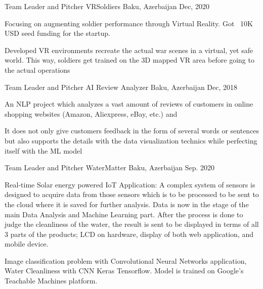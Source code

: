 

\begin{cventries}

  \cventry
    {Team Leader and Pitcher} %
    {VRSoldiers} %
    {Baku, Azerbaijan} %
    {Dec, 2020} %
    {
      \begin{cvitems} %
        \item {Focusing on augmenting soldier performance through Virtual Reality. Got ~10K USD seed funding for the startup.}
        \item {Developed VR environments recreate the actual war scenes in a virtual, yet safe world. This way, soldiers get trained on the 3D mapped VR area before going to the actual operations}
      \end{cvitems}
    }

  \cventry
    {Team Leader and Pitcher} %
    {AI Review Analyzer} %
    {Baku, Azerbaijan} %
    {Dec, 2018} %
    {
      \begin{cvitems} %
        \item {An NLP project which analyzes a vast amount of reviews of customers in online shopping websites (Amazon, Aliexpress, eBay, etc.) and }
        \item {It does not only give customers feedback in the form of several words or sentences but also supports the details with the data visualization technics while perfecting itself with the ML model}
      \end{cvitems}
    }

  \cventry
    {Team Leader and Pitcher} %
    {WaterMatter} %
    {Baku, Azerbaijan} %
    {Sep. 2020} %
    {
      \begin{cvitems} %
        \item {Real-time Solar energy powered IoT Application:
A complex system of sensors is designed to acquire data from those sensors which is to be processed to be sent to the cloud where it is saved for further analysis. Data is now in the stage of the main Data Analysis and Machine Learning part. After the process is done to judge the cleanliness of the water, the result is sent to be displayed in terms of all 3 parts of the products; LCD on hardware, display of both web application, and mobile device.}
        \item {Image classification problem with Convolutional Neural Networks application, Water Cleanliness with CNN Keras Tensorflow. Model is trained on Google's Teachable Machines platform.}
      \end{cvitems}
    }

\end{cventries}

